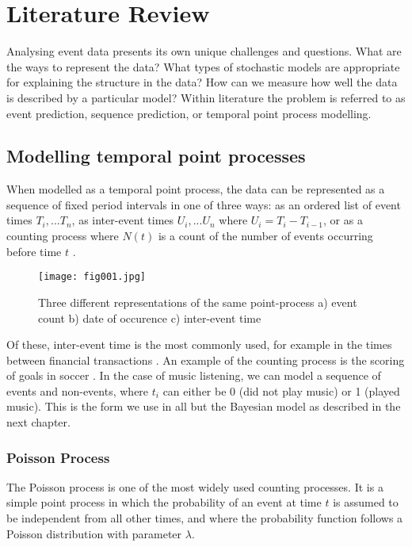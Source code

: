 
\chapter{Literature Review} %


\label{Chapter2} %

Analysing event data presents its own unique challenges and questions. What are the ways to represent the data?  What types of stochastic 
models  are  appropriate  for  explaining  the  structure  in  the  data? How  can  we  measure  
how  well  the  data  is  described  by  a  particular  model?  Within literature the problem is referred to as event prediction, sequence prediction, or temporal point process modelling.

\section{Modelling temporal point processes}

When modelled as a temporal point process, the data can be represented as a sequence of fixed period intervals in one of three ways: as an ordered list of event times ${T_i,...T_n}$, as inter-event times $U_i,...U_n$ where $U_i = T_i-T_{i-1}$, or as a counting process where  $N(t)$ is a count of the number of events occurring before time $t$ \parencite{Borgan}.

\begin{figure}[h!]
	\texttt{[image: fig001.jpg]}
	\caption{Three different representations of the same point-process a) event count b) date of occurence c) inter-event time}
	\label{fig:fig1}
\end{figure}

Of these, inter-event time is the most commonly used, for example in the times between financial transactions \parencite{EngleRusell}. An example of the counting process is the scoring of goals in soccer \parencite{Heuer}. In the case of music listening, we can model a sequence of events and non-events, where $t_i$ can either be 0 (did not play music) or 1 (played music). This is the form we use in all but the Bayesian model as described in the next chapter.

\newpage

\subsection{Poisson Process}
The Poisson process \parencite{Kingman} is one of the most widely used counting processes. It is a simple point process in which the probability of an event at time $t$ is assumed to be independent from all other times, and where the probability function follows a Poisson distribution with parameter $\lambda$. 

